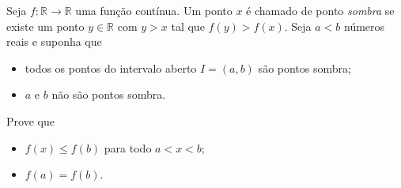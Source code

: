 Seja \(f\colon \mathbb{R} \to \mathbb{R}\) uma função contínua. Um ponto \(x\) é chamado de ponto \textit{sombra} se existe um ponto \(y\in \mathbb{R}\) com \(y>x\) tal que \(f(y)>f(x).\) Seja \(a<b\) números reais e suponha que
\begin{itemize}
\item todos os pontos do intervalo aberto \(I=(a,b)\) são pontos sombra;
\item \(a\) e \(b\) não são pontos sombra.
\end{itemize}
Prove que
\begin{itemize}
\item[(a)] \(f(x)\leq f(b)\) para todo \(a<x<b;\)
\item[(b)] \(f(a)=f(b).\)
\end{itemize}
